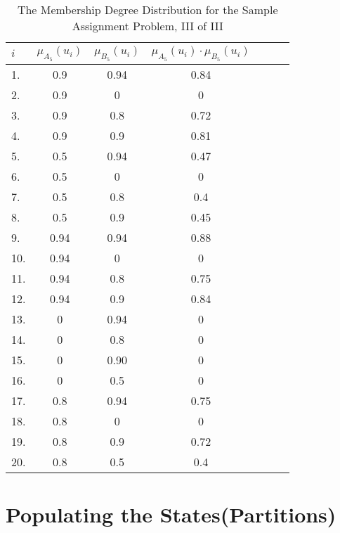 \documentclass[a4paper,openany]{book}
\begin{document}
				\begin{table}[!th]
					\begin{tabular}{|l|c|c|c|c|c|c|}
					\hline
					\textbf{$i$} & \textbf{$\mu_{A_5}(u_i)$} & \textbf{$\mu_{B_5}(u_i)$} & \textbf{$\mu_{A_5}(u_i)\cdot\mu_{B_5}(u_i)$}\\
					\hline
					1. & 0.9 & 0.94 & 0.84 \\
					\hline
					2. & 0.9 & 0 & 0 \\
					\hline
					3. & 0.9 & 0.8 & 0.72 \\
					\hline
					4. & 0.9 & 0.9 & 0.81 \\
					\hline
					5. & 0.5 & 0.94 & 0.47 \\
					\hline
					6. & 0.5 & 0 & 0 \\
					\hline
					7. & 0.5 & 0.8 & 0.4 \\
					\hline
					8. & 0.5 & 0.9 & 0.45 \\
					\hline
					9. & 0.94 & 0.94 & 0.88 \\
					\hline
					10. & 0.94 & 0 & 0 \\
					\hline
					11. & 0.94 & 0.8 & 0.75 \\
					\hline
					12. & 0.94 & 0.9 & 0.84 \\
					\hline
					13. & 0 & 0.94 & 0 \\
					\hline
					14. & 0 & 0.8 & 0 \\
					\hline
					15. & 0 & 0.90 & 0 \\
					\hline
					16. & 0 & 0.5 & 0 \\
					\hline
					17. & 0.8 & 0.94 & 0.75 \\
					\hline
					18. & 0.8 & 0 & 0 \\
					\hline
					19. & 0.8 & 0.9 & 0.72 \\
					\hline
					20. & 0.8 & 0.5 & 0.4 \\
					\hline
					\end{tabular}
					\caption{The Membership Degree Distribution for the Sample Assignment Problem, III of III}
					\label{ex:table4}
				\end{table}
		\section{Populating the States(Partitions)}
\end{document}
